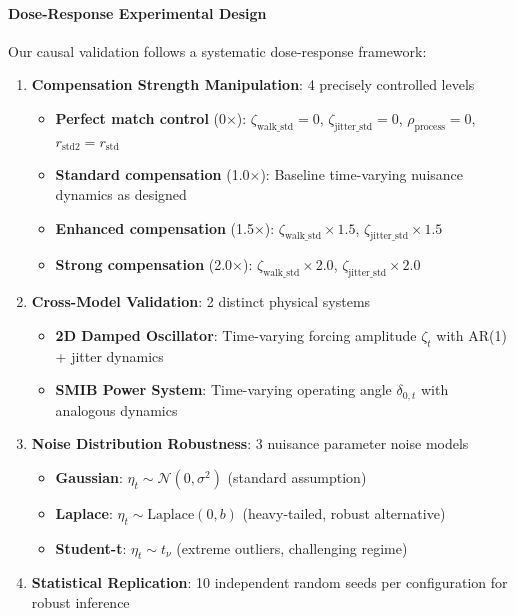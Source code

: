 \documentclass[conference]{IEEEtran}
\begin{document}
\paragraph{Dose-Response Experimental Design}
Our causal validation follows a systematic dose-response framework:
\begin{enumerate}
\item \textbf{Compensation Strength Manipulation}: 4 precisely controlled levels
  \begin{itemize}
  \item \textbf{Perfect match control} (0×): $\zeta_{\text{walk\_std}} = 0$, $\zeta_{\text{jitter\_std}} = 0$, $\rho_{\text{process}} = 0$, $r_{\text{std2}} = r_{\text{std}}$
  \item \textbf{Standard compensation} (1.0×): Baseline time-varying nuisance dynamics as designed
  \item \textbf{Enhanced compensation} (1.5×): $\zeta_{\text{walk\_std}} \times 1.5$, $\zeta_{\text{jitter\_std}} \times 1.5$
  \item \textbf{Strong compensation} (2.0×): $\zeta_{\text{walk\_std}} \times 2.0$, $\zeta_{\text{jitter\_std}} \times 2.0$
  \end{itemize}

\item \textbf{Cross-Model Validation}: 2 distinct physical systems
  \begin{itemize}
  \item \textbf{2D Damped Oscillator}: Time-varying forcing amplitude $\zeta_t$ with AR(1) + jitter dynamics
  \item \textbf{SMIB Power System}: Time-varying operating angle $\delta_{0,t}$ with analogous dynamics
  \end{itemize}

\item \textbf{Noise Distribution Robustness}: 3 nuisance parameter noise models
  \begin{itemize}
  \item \textbf{Gaussian}: $\eta_t \sim \mathcal{N}(0, \sigma^2)$ (standard assumption)
  \item \textbf{Laplace}: $\eta_t \sim \text{Laplace}(0, b)$ (heavy-tailed, robust alternative)
  \item \textbf{Student-t}: $\eta_t \sim t_{\nu}$ (extreme outliers, challenging regime)
  \end{itemize}

\item \textbf{Statistical Replication}: 10 independent random seeds per configuration for robust inference
\end{enumerate}
\end{document}
